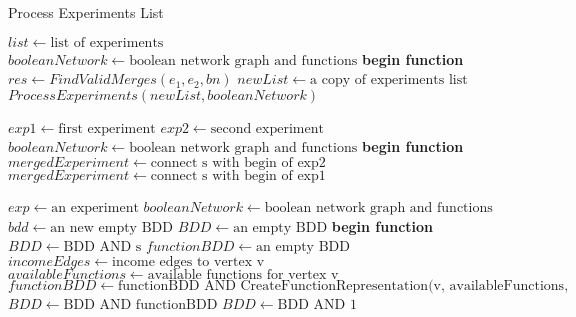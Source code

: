 \documentclass{article}      %
\newcounter{ct}
\begin{document}
\begin{algorithm} \caption{Process Experiments List}
\begin{algorithmic}[1]
\State $list \gets \text{list of experiments}$
\State $booleanNetwork \gets \text{boolean network graph and functions}$
\State \textbf{begin function}
        \State $res \gets FindValidMerges(e_1, e_2, bn)$
        \State $newList \gets \text{a copy of experiments list}$
        \State {}
        \State {} $ProcessExperiments(newList, booleanNetwork)$
    \EndFor
\EndFunction
\State {}
\end{algorithmic}
\end{algorithm}
\begin{algorithm}
\begin{algorithmic}[1]
\State $exp1 \gets \text{first experiment}$
\State $exp2 \gets \text{second experiment}$
\State $booleanNetwork \gets \text{boolean network graph and functions}$
\State \textbf{begin function}
        \State $mergedExperiment \gets \text{connect s with begin of exp2}$
                \State {}
        \EndIf
    \EndFor
        \State $mergedExperiment \gets \text{connect s with begin of exp1}$
                \State {}
        \EndIf
    \EndFor
\EndFunction
\end{algorithmic}
\end{algorithm}
\begin{algorithm}
\begin{algorithmic}[1]
\State $exp \gets \text{an experiment}$
\State $booleanNetwork \gets \text{boolean network graph and functions}$
\State $bdd \gets \text{an new empty BDD}$
\State {}
\State $BDD \gets \text{an empty BDD}$
\State \textbf{begin function}
        \State $BDD \gets \text {BDD AND s}$
    \EndFor
\State $functionBDD \gets \text{an empty BDD}$
        \State $incomeEdges \gets \text{income edges to vertex v}$
        \State $availableFunctions \gets \text{available functions for vertex v}$
        \State $functionBDD \gets \text{functionBDD AND CreateFunctionRepresentation(v, availableFunctions, incomeEdges, experiment.length)}$
    \EndFor
\State $BDD \gets \text{BDD AND functionBDD}$
\State $BDD \gets \text{BDD AND 1}$
    \State {}
\EndIf
    \State {}
\EndFunction
\end{algorithmic}
\end{algorithm}
\end{document}

